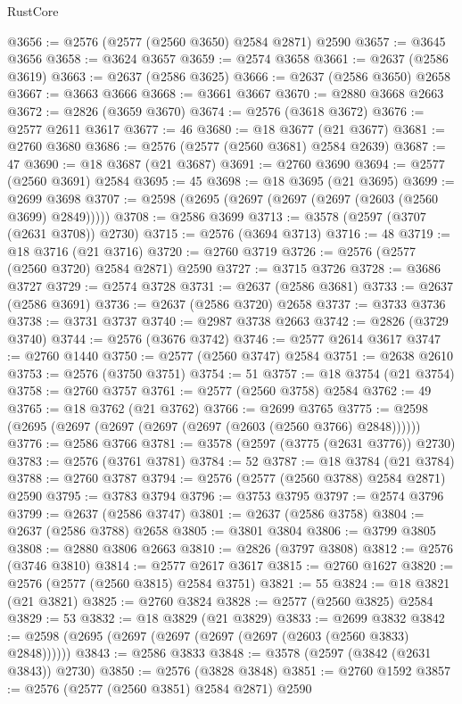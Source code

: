 \begin{lexlean}{RustCore}
\begin{coremodule}
@3656 := @2576 (@2577 (@2560 @3650) @2584 @2871) @2590
@3657 := @3645 @3656
@3658 := @3624 @3657
@3659 := @2574 @3658
@3661 := @2637 (@2586 @3619)
@3663 := @2637 (@2586 @3625)
@3666 := @2637 (@2586 @3650) @2658
@3667 := @3663 @3666
@3668 := @3661 @3667
@3670 := @2880 @3668 @2663
@3672 := @2826 (@3659 @3670)
@3674 := @2576 (@3618 @3672)
@3676 := @2577 @2611 @3617
@3677 := 46
@3680 := @18 @3677 (@21 @3677)
@3681 := @2760 @3680
@3686 := @2576 (@2577 (@2560 @3681) @2584 @2639)
@3687 := 47
@3690 := @18 @3687 (@21 @3687)
@3691 := @2760 @3690
@3694 := @2577 (@2560 @3691) @2584
@3695 := 45
@3698 := @18 @3695 (@21 @3695)
@3699 := @2699 @3698
@3707 := @2598 (@2695 (@2697 (@2697 (@2697 (@2603 (@2560 @3699) @2849)))))
@3708 := @2586 @3699
@3713 := @3578 (@2597 (@3707 (@2631 @3708)) @2730)
@3715 := @2576 (@3694 @3713)
@3716 := 48
@3719 := @18 @3716 (@21 @3716)
@3720 := @2760 @3719
@3726 := @2576 (@2577 (@2560 @3720) @2584 @2871) @2590
@3727 := @3715 @3726
@3728 := @3686 @3727
@3729 := @2574 @3728
@3731 := @2637 (@2586 @3681)
@3733 := @2637 (@2586 @3691)
@3736 := @2637 (@2586 @3720) @2658
@3737 := @3733 @3736
@3738 := @3731 @3737
@3740 := @2987 @3738 @2663
@3742 := @2826 (@3729 @3740)
@3744 := @2576 (@3676 @3742)
@3746 := @2577 @2614 @3617
@3747 := @2760 @1440
@3750 := @2577 (@2560 @3747) @2584
@3751 := @2638 @2610
@3753 := @2576 (@3750 @3751)
@3754 := 51
@3757 := @18 @3754 (@21 @3754)
@3758 := @2760 @3757
@3761 := @2577 (@2560 @3758) @2584
@3762 := 49
@3765 := @18 @3762 (@21 @3762)
@3766 := @2699 @3765
@3775 := @2598 (@2695 (@2697 (@2697 (@2697 (@2697 (@2603 (@2560 @3766) @2848))))))
@3776 := @2586 @3766
@3781 := @3578 (@2597 (@3775 (@2631 @3776)) @2730)
@3783 := @2576 (@3761 @3781)
@3784 := 52
@3787 := @18 @3784 (@21 @3784)
@3788 := @2760 @3787
@3794 := @2576 (@2577 (@2560 @3788) @2584 @2871) @2590
@3795 := @3783 @3794
@3796 := @3753 @3795
@3797 := @2574 @3796
@3799 := @2637 (@2586 @3747)
@3801 := @2637 (@2586 @3758)
@3804 := @2637 (@2586 @3788) @2658
@3805 := @3801 @3804
@3806 := @3799 @3805
@3808 := @2880 @3806 @2663
@3810 := @2826 (@3797 @3808)
@3812 := @2576 (@3746 @3810)
@3814 := @2577 @2617 @3617
@3815 := @2760 @1627
@3820 := @2576 (@2577 (@2560 @3815) @2584 @3751)
@3821 := 55
@3824 := @18 @3821 (@21 @3821)
@3825 := @2760 @3824
@3828 := @2577 (@2560 @3825) @2584
@3829 := 53
@3832 := @18 @3829 (@21 @3829)
@3833 := @2699 @3832
@3842 := @2598 (@2695 (@2697 (@2697 (@2697 (@2697 (@2603 (@2560 @3833) @2848))))))
@3843 := @2586 @3833
@3848 := @3578 (@2597 (@3842 (@2631 @3843)) @2730)
@3850 := @2576 (@3828 @3848)
@3851 := @2760 @1592
@3857 := @2576 (@2577 (@2560 @3851) @2584 @2871) @2590

\end{coremodule}
\end{lexlean}
